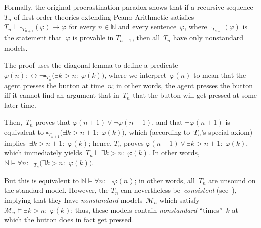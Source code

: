 \documentclass[12pt]{article}
\newcommand{\vp}{\varphi}
\newcommand{\NN}{\mathbb{N}}
\newcommand{\cM}{\mathcal{M}}
\theoremstyle{plain}
\theoremstyle{definition}
\theoremstyle{remark}
\begin{document}
Formally, the original procrastination paradox shows that if a recursive sequence~$T_n$ of first-order theories extending Peano Arithmetic satisfies $T_n \vdash \square_{T_{n+1}}(\vp)\to\vp$ for every $n\in\NN$ and every sentence~$\vp$, where $\square_{T_{n+1}}(\vp)$ is the statement that~$\vp$ is provable in $T_{n+1}$, then all~$T_n$ have only nonstandard models.

The proof uses the diagonal lemma to define a predicate~$\vp(n) :\leftrightarrow \neg\square_{T_n}\big(\exists k>n{:}\;\vp(k)\big)$, where we interpret~$\vp(n)$ to mean that the agent presses the button at time~$n$; in other words, the agent presses the button iff it cannot find an argument that in~$T_n$ that the button will get pressed at some later time.

Then,~$T_n$ proves that $\vp(n+1)\vee\neg\vp(n+1)$, and that $\neg\vp(n+1)$ is equivalent to $\square_{T_{n+1}}\big(\exists k>n+1{:}\;\vp(k)\big)$, which (according to~$T_n$'s special axiom) implies~$\exists k>n+1{:}\;\vp(k)$; hence, $T_n$ proves $\vp(n+1)\vee\exists k>n+1{:}\;\vp(k)$, which immediately yields~$T_n\vdash\exists k>n{:}\;\vp(k)$. In other words, $\NN\vDash\forall n{:}\;\square_{T_n}\big(\exists k>n{:}\;\vp(k)\big)$. 

But this is equivalent to $\NN\vDash\forall n{:}\;\neg\vp(n)$; in other words, all~$T_n$ are unsound on the standard model. However, the $T_n$ can nevertheless be~\emph{consistent} (see~\cite{yudkowsky13}), implying that they have \emph{nonstandard} models~$\cM_n$ which satisfy $\cM_n\vDash\exists k>n{:}\;\vp(k)$; thus, these models contain \emph{nonstandard} ``times''~$k$ at which the button does in fact get pressed.
\end{document}
